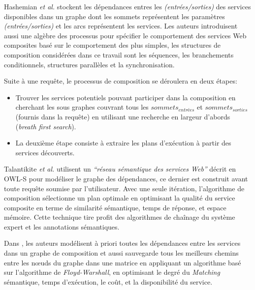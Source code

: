   Hashemian \textit{et al.} \cite{hashemian2006graph} stockent les
  dépendances entres les \textit{(entrées/sorties)} des services
  disponibles dans un graphe dont les sommets représentent les
  paramètres \textit{(entrées/sorties)} et les arcs représentent les
  services. Les auteurs introduisent aussi une algèbre des processus
  pour spécifier le comportement des services Web composites basé sur
  le comportement des plus simples, les structures de composition
  considérées dans ce travail sont les séquences, les branchements
  conditionnels, structures parallèles et la synchronisation.

  Suite à une requête, le processus de composition se déroulera en
  deux étapes:

  \SpecialItem
  \begin{itemize}
  \item Trouver les services potentiels pouvant participer dans la
    composition en cherchant les sous graphes couvrant tous les
    $sommets_{entrées}$ et $sommets_{sorties}$ (fournis dans la
    requête) en utilisant une recherche en largeur d'abords
    (\textit{breath first search}).

  \item La deuxième étape consiste à extraire les plans d'exécution
    à partir des services découverts.\bigskip
  \end{itemize}

  Talantikite \textit{et al.} \cite{talantikite2009semantic} utilisent
  un \emph{``réseau sémantique des services Web''} décrit en
  \textsc{OWL-S} pour modéliser le graphe des dépendances, ce dernier
  est construit avant toute requête soumise par l'utilisateur. Avec
  une seule itération, l'algorithme de composition sélectionne un plan
  optimale en optimisant la qualité du service composite en terme de
  similarité sémantique, temps de réponse, et espace mémoire.
  Cette technique tire profit des algorithmes de chaînage du
  système expert et les annotations sémantiques.\bigskip

  Dans \cite{elmaghraoui2011graph}, les auteurs modélisent à priori
  toutes les dépendances entre les services dans un graphe de
  composition et aussi sauvegarde tous les meilleurs chemins entre les
  nœuds du graphe dans une matrice en appliquant un algorithme basé
  sur l'algorithme de \textit{Floyd-Warshall}, en optimisant le degré
  du \textit{Matching} sémantique, temps d'exécution, le coût, et la
  disponibilité du service.

